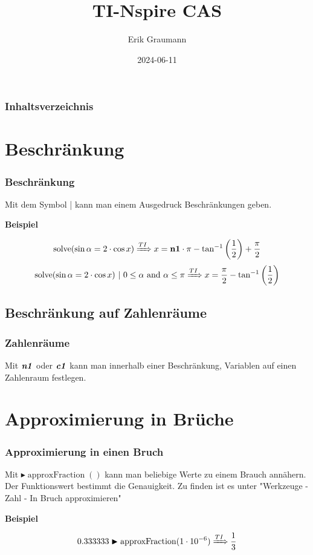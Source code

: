 \documentclass[10pt,ngerman]{beamer}
\title{TI-Nspire CAS}
\author{Erik Graumann}
\institute[TSS]{Theodor-Storm-Schule Husum}
\date{2024-06-11}
\begin{document}
\frame{\titlepage}

\begin{frame}
	\frametitle{Inhaltsverzeichnis}
	\tableofcontents
\end{frame}

\section{Beschränkung}

\begin{frame}
	\frametitle{Beschränkung}

	Mit dem Symbol | kann man einem Ausgedruck Beschränkungen geben. \newline

	\textbf{Beispiel}

	\begin{equation}
		\operatorname{solve}(\sin \alpha = 2 \cdot \cos x) \xRightarrow{TI} x = \textbf{n1} \cdot \pi-\tan^{-1}\left(\frac{1}{2}\right) + \frac{\pi}{2}
	\end{equation}
	\begin{equation}
		\operatorname{solve}(\sin \alpha = 2 \cdot \cos x)\ \vert \ 0 \le \alpha\ \text{and}\ \alpha \le \pi \xRightarrow{TI} x = \frac{\pi}{2} - \tan^{-1}\left(\frac{1}{2}\right)
	\end{equation}

\end{frame}

\subsection{Beschränkung auf Zahlenräume}

\begin{frame}
	\frametitle{Zahlenräume}

	Mit \(\text{\textbf{\textit{n1}}}\) oder \(\text{\textbf{\textit{c1}}}\) kann man innerhalb einer Beschränkung, Variablen auf einen Zahlenraum festlegen.

\end{frame}

\section{Approximierung in Brüche}

\begin{frame}
	\frametitle{Approximierung in einen Bruch}

	Mit \(\blacktriangleright\operatorname{approxFraction}()\) kann man beliebige Werte zu einem Brauch annähern. Der Funktionswert bestimmt die Genauigkeit. Zu finden ist es unter "Werkzeuge - Zahl - In Bruch approximieren" \newline

	\textbf{Beispiel}

	\begin{equation}
		0.333333 \blacktriangleright\operatorname{approxFraction}(1 \cdot 10^{-6}) \xRightarrow{TI} \frac{1}{3}
	\end{equation}


\end{frame}
\end{document}
